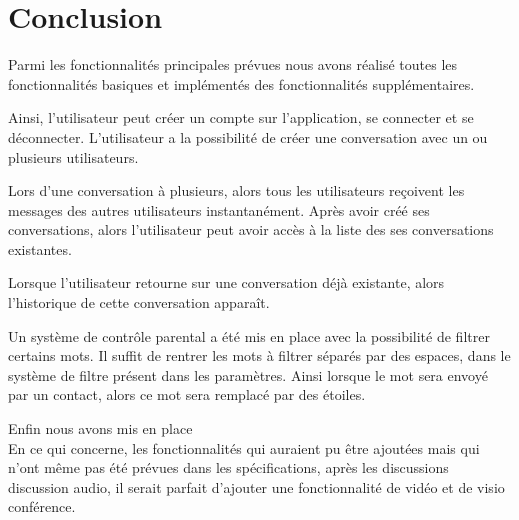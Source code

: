 \newpage
\part{Conclusion}

\par Parmi les fonctionnalités principales prévues nous avons réalisé toutes les fonctionnalités basiques et implémentés des fonctionnalités supplémentaires. \\

\par Ainsi, l'utilisateur peut créer un compte sur l'application, se connecter et se déconnecter. L'utilisateur a la possibilité de créer une conversation avec un ou plusieurs utilisateurs. 
\par Lors d'une conversation à plusieurs, alors tous les utilisateurs reçoivent les messages des autres utilisateurs instantanément. Après avoir créé ses conversations, alors l'utilisateur peut avoir accès à la liste des ses conversations existantes.
\par Lorsque l'utilisateur retourne sur une conversation déjà existante, alors l'historique de cette conversation apparaît.
\par Un système de contrôle parental a été mis en place avec la possibilité de filtrer certains mots. Il suffit de rentrer les mots à filtrer séparés par des espaces, dans le système de filtre présent dans les paramètres. Ainsi lorsque le mot sera envoyé par un contact, alors ce mot sera remplacé par des étoiles.
\par Enfin nous avons mis en place \\



En ce qui concerne, les fonctionnalités qui auraient pu être ajoutées mais qui n’ont même pas été prévues dans les spécifications, après les discussions discussion audio, il serait parfait d'ajouter une fonctionnalité de vidéo et de visio conférence. 